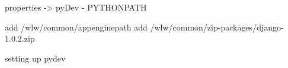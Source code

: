 
properties -> pyDev - PYTHONPATH 

add /wlw/common/appenginepath
add /wlw/common/zip-packages/django-1.0.2.zip

setting up pydev

